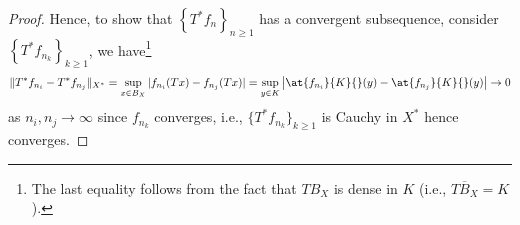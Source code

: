 \begin{proof}
	Hence, to show that \(\left\{ T^{\ast} f_n \right\}_{n\geq 1} \) has a convergent subsequence, consider \(\left\{ T^{\ast} f_{n_k} \right\}_{k\geq 1} \), we have\footnote{The last equality follows from the fact that \(TB_X\) is dense in \(K\) (i.e., \(\overline{TB_X} = K\)).}
	\[
		\lVert T^{\ast} f_{n_i} - T^{\ast} f_{n_j} \rVert_{X^{\ast} }
		= \sup _{x\in B_X} \vert f_{n_i}(Tx) - f_{n_j}(Tx)\vert
		= \sup _{y\in K} \left\vert \at{f_{n_i}}{K}{} (y) - \at{f_{n_j}}{K}{} (y) \right\vert \to 0
	\]
	as \(n_i, n_j \to \infty \) since \(f_{n_k}\) converges, i.e., \(\{T^{\ast} f_{n_{k} }\}_{k\geq 1}\) is Cauchy in \(X^{\ast} \) hence converges.
\end{proof}